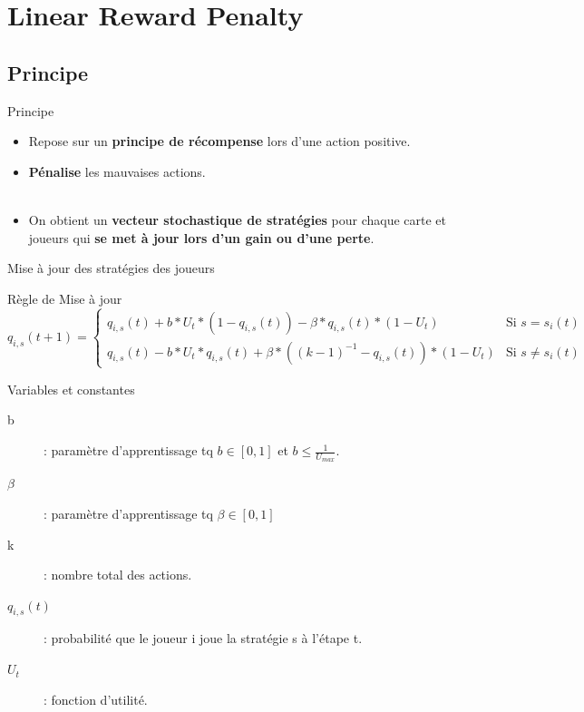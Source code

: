 \section{Linear Reward Penalty}
\subsection{Principe}

\begin{frame}{Principe}
\begin{itemize}
    \item Repose sur un \textbf{principe de récompense} lors d'une action positive.
    \item \textbf{Pénalise} les mauvaises actions.\\~\
    \item On obtient un \textbf{vecteur stochastique de stratégies} pour chaque carte et joueurs qui \textbf{se met à jour lors d'un gain ou d'une perte}.
\end{itemize}
\end{frame}

\begin{frame}{Mise à jour des stratégies des joueurs}
    \begin{block}{Règle de Mise à jour}
    \fontsize{8pt}{15pt}
    $q_{i,s}(t+1)=\left\{
    \begin{array}{ll}
        q_{i,s}(t)+b*U_{t}*(1-q_{i,s}(t))-\beta*q_{i,s}(t)* (1-U_{t}) & \mbox{Si } s=s_i(t) \\
         q_{i,s}(t)-b*U_{t}*q_{i,s}(t)+\beta*((k-1)^{-1}- q_{i,s}(t))*(1-U_{t}) & \mbox{Si } s\neq s_i(t)
    \end{array}
\right.$
    \end{block}
    
    \begin{exampleblock}{Variables et constantes}
    \begin{description}
    
    \item[b] : paramètre d'apprentissage tq $b \in [0,1]$ et $b\leq \frac{1}{U_{max}}$.
    \item[$\beta$] : paramètre d'apprentissage tq $\beta \in [0,1]$
    \item[k] : nombre total des actions.
    \item[$q_{i,s}(t)$] : probabilité que le joueur i joue la stratégie s à l'étape t.
    \item[$U_t$] : fonction d'utilité. %
    
    \end{description}
    \end{exampleblock}
    
\end{frame}


